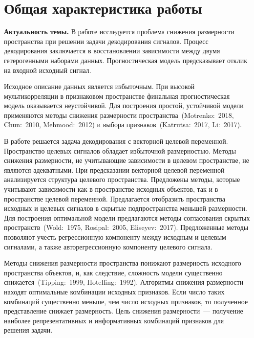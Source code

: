 \documentclass[11pt, a5paper]{dissert}
\begin{document}
\clearpage




\section*{Общая характеристика работы}
\label{ch:Intro}

\textbf{Актуальность темы.} 
В работе исследуется проблема снижения размерности пространства при решении задачи декодирования сигналов. 
Процесс декодирования заключается в восстановлении зависимости между двумя гетерогенными наборами данных.
Прогностическая модель предсказывает отклик на входной исходный сигнал.

Исходное описание данных является избыточным. 
При высокой мультикорреляции в признаковом пространстве финальная прогностическая модель оказывается неустойчивой.
Для построения простой, устойчивой модели применяются методы снижения размерности пространства~(Motrenko:~2018, Chun:~2010, Mehmood:~2012)  и выбора признаков~(Katrutsa:~2017, Li:~2017).

В работе решается задача декодирования с векторной целевой переменной. 
Пространство целевых сигналов обладает избыточной размерностью. 
Методы снижения размерности, не учитывающие зависимости в целевом пространстве, не являются адекватными.
При предсказании векторной целевой переменной анализируется структура целевого пространства.
Предложены методы, которые учитывают зависимости как в пространстве исходных объектов, так и в пространстве целевой переменной.
Предлагается отобразить пространства исходных и целевых сигналов в скрытые подпространства меньшей размерности.
Для построения оптимальной модели предлагаются методы согласования скрытых пространств~(Wold:~1975, Rosipal:~2005, Eliseyev:~2017).
Предложенные методы позволяют учесть регрессионную компоненту между исходным и целевым сигналами, а также авторегрессионную компоненту целевого сигнала.

Методы снижения размерности пространства понижают размерность исходного пространства объектов, и, как следствие, сложность модели существенно снижается~(Tipping:~1999, Hotelling:~1992). 
Алгоритмы снижения размерности находят оптимальные комбинации исходных признаков. 
Если число таких комбинаций существенно меньше, чем число исходных признаков, то полученное представление снижает размерность.
Цель снижения размерности~--- получение наиболее репрезентативных и информативных комбинаций признаков для решения задачи.
\end{document}
